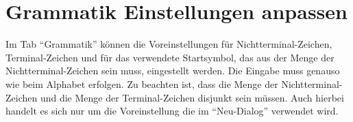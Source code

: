 \section{Grammatik Einstellungen anpassen}

Im Tab "`Grammatik"' können die Voreinstellungen für Nichtterminal-Zeichen,
Terminal-Zeichen und für das verwendete Startsymbol, das aus der Menge der
Nichtterminal-Zeichen sein muss, eingestellt werden. Die Eingabe muss genauso
wie beim Alphabet erfolgen. Zu beachten ist, dass die Menge der Nichtterminal-
Zeichen und die Menge der Terminal-Zeichen disjunkt sein müssen. Auch hierbei
handelt es sich nur um die Voreinstellung die im "`Neu-Dialog"' verwendet wird.